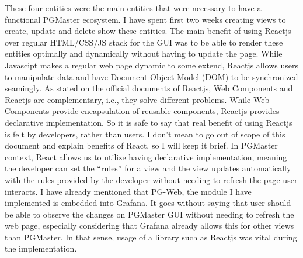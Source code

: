 These four entities were the main entities that were necessary to have a 
functional PGMaster ecosystem. I have spent first two weeks creating views 
to create, update and delete show these entities. The main benefit of using 
Reactjs over regular HTML/CSS/JS stack for the GUI was to be able to render 
these entities optimally and dynamically without having to update the page. 
While Javascipt makes a regular web page dynamic to some extend, Reactjs 
allows users to manipulate data and have Document Object Model (DOM) to be 
synchronized seamingly. As stated on the official documents of Reactjs, 
Web Components and Reactjs are complementary, i.e., they solve different 
problems. While Web Components provide encapsulation of reusable components, 
Reactjs provides declarative implementation. So it is safe to say that real 
benefit of using Reactjs is felt by developers, rather than users. I don't 
mean to go out of scope of this document and explain benefits of React, so I 
will keep it brief. In PGMaster context, React allows us to utilize having 
declarative implementation, meaning the developer can set the ``rules'' for 
a view and the view updates automatically with the rules provided by the 
developer without needing to refresh the page user interacts. I have already 
mentioned that PG-Web, the module I have implemented is embedded into Grafana. 
It goes without saying that user should be able to observe the changes on 
PGMaster GUI without needing to refresh the web page, especially considering 
that Grafana already allows this for other views than PGMaster. In that sense, 
usage of a library such as Reactjs was vital during the implementation.

